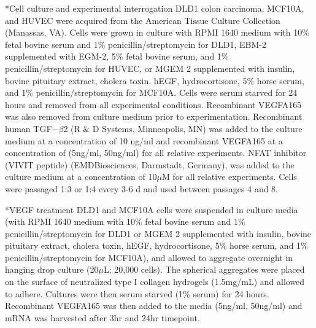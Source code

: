 \documentclass[12pt]{article}
\makeatletter
\renewcommand\subsection{\@startsection
	{subsection}{2}{0mm}
	{-0.05in}
	{-0.5\baselineskip}
	{\normalfont\normalsize\bfseries}}
\renewcommand\subsubsection{\@startsection
	{subsubsection}{2}{0mm}
	{-0.05in}
	{-0.5\baselineskip}
	{\normalfont\normalsize\itshape}}
\makeatother
\begin{document}
\subsection*{Cell culture and experimental interrogation}
DLD1 colon carcinoma, MCF10A, and HUVEC were acquired from the American Tissue Culture Collection (Manassas, VA). Cells were grown in culture with RPMI 1640 medium with 10\% fetal bovine serum and 1\% penicillin/streptomycin for DLD1, EBM-2 supplemented with EGM-2, 5\% fetal bovine serum, and 1\% penicillin/streptomycin for HUVEC, or MGEM 2 supplemented with insulin, bovine pituitary extract, cholera toxin, hEGF, hydrocortisone, 5\% horse serum, and 1\% penicillin/streptomycin for MCF10A. Cells were serum starved for 24 hours and removed from all experimental conditions.  Recombinant VEGFA165 was also removed from culture medium prior to experimentation.  Recombinant human TGF$-\beta$2 (R$\And$D Systems, Minneapolis, MN) was added to the culture medium at a concentration of 10 ng/ml and recombinant VEGFA165 at a concentration of (5ng/ml, 50ng/ml) for all relative experiments.  NFAT inhibitor (VIVIT peptide) (EMDBiosciences, Darmstadt, Germany), was added to the culture medium at a concentration of 10$\mu$M for all relative experiments.   Cells were passaged 1:3 or 1:4 every 3-6 d and used between passages 4 and 8.

\subsubsection*{VEGF treatment}
DLD1 and MCF10A cells were suspended in culture media (with RPMI 1640 medium with 10\% fetal bovine serum and 1\% penicillin/streptomycin for DLD1 or MGEM 2 supplemented with insulin, bovine pituitary extract, cholera toxin, hEGF, hydrocortisone, 5\% horse serum, and 1\% penicillin/streptomycin for MCF10A), and allowed to aggregate overnight in hanging drop culture (20$\mu$L; 20,000 cells).  The spherical aggregates were placed on the surface of neutralized type I collagen hydrogels (1.5mg/mL) and allowed to adhere.  Cultures were then serum starved (1\% serum) for 24 hours.  Recombinant VEGFA165 was then added to the media (5ng/ml, 50ng/ml) and mRNA was harvested after 3hr and 24hr timepoint.
\end{document}

